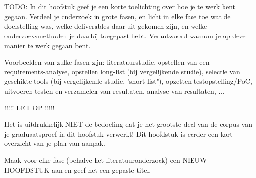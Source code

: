 
\chapter{}%
\label{ch:methodologie}

TODO: In dit hoofstuk geef je een korte toelichting over hoe je te werk bent
gegaan. Verdeel je onderzoek in grote fasen, en licht in elke fase toe wat
de doelstelling was, welke deliverables daar uit gekomen zijn, en welke
onderzoeksmethoden je daarbij toegepast hebt. Verantwoord waarom je
op deze manier te werk gegaan bent.

Voorbeelden van zulke fasen zijn: literatuurstudie, opstellen van een
requirements-analyse, opstellen long-list (bij vergelijkende studie),
selectie van geschikte tools (bij vergelijkende studie, "short-list"),
opzetten testopstelling/PoC, uitvoeren testen en verzamelen
van resultaten, analyse van resultaten, ...

!!!!! LET OP !!!!!

Het is uitdrukkelijk NIET de bedoeling dat je het grootste deel van de corpus
van je graduaatsproef in dit hoofstuk verwerkt! Dit hoofdstuk is eerder een
kort overzicht van je plan van aanpak.

Maak voor elke fase (behalve het literatuuronderzoek) een NIEUW HOOFDSTUK aan
en geef het een gepaste titel.


